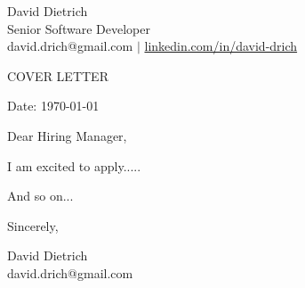 \documentclass[11pt,a4]{article}
\begin{document}
\begin{center}
    
\centering
{\Huge David Dietrich} \\ %
\vspace{0.1cm}
{\color{UI_blue} \Large{Senior Software Developer}} \\
\vspace{0.1cm}
\large david.drich@gmail.com $\vert$ \large {\href{https://www.linkedin.com/in/david-drich/}{linkedin.com/in/david-drich} }

\vspace{-0.15cm} 
{\color{UI_blue} \hrulefill}
\end{center}

\justify
\setlength{\parindent}{0pt}
\setlength{\parskip}{12pt}
\vspace{0.2cm}
\begin{center}
    {\color{UI_blue} \Large{COVER LETTER}}
\end{center}



Date: \today \par \vspace{-0.1cm}
Dear Hiring Manager, %

I am excited to apply..... \par

And so on... \par


\vspace{0.5cm}
\raggedright
Sincerely, \\
\vspace{0.2cm}
\raggedright
David Dietrich \\ david.drich@gmail.com
\end{document}
